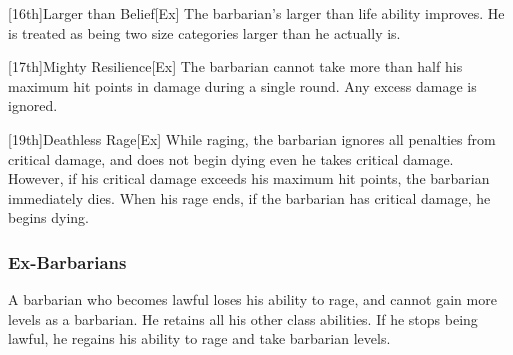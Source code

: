         [16th]{Larger than Belief}[Ex]
        The barbarian's larger than life ability improves.
        He is treated as being two size categories larger than he actually is.

        [17th]{Mighty Resilience}[Ex]
        The barbarian cannot take more than half his maximum hit points in damage during a single round.
        Any excess damage is ignored.

        [19th]{Deathless Rage}[Ex]
        While raging, the barbarian ignores all penalties from critical damage, and does not begin dying even he takes critical damage.
        However, if his critical damage exceeds his maximum hit points, the barbarian immediately dies.
        When his rage ends, if the barbarian has critical damage, he begins dying.

        \subsubsection{Ex-Barbarians}
            A barbarian who becomes lawful loses his ability to rage, and cannot gain more levels as a barbarian.
            He retains all his other class abilities.
            If he stops being lawful, he regains his ability to rage and take barbarian levels.

